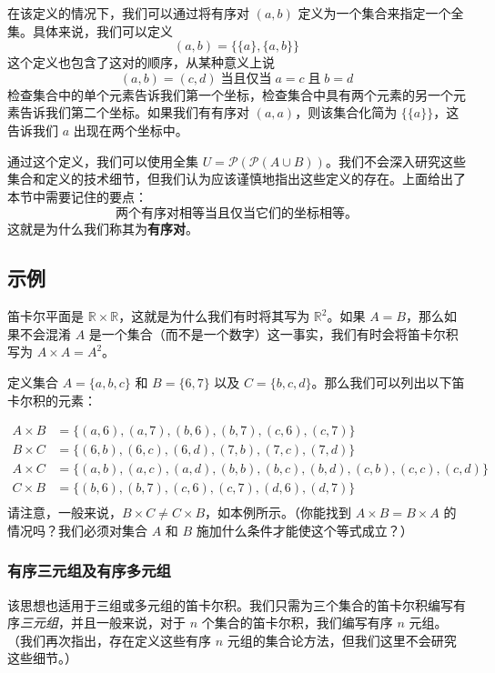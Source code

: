 在该定义的情况下，我们可以通过将有序对 $(a, b)$ 定义为一个集合来指定一个全集。具体来说，我们可以定义
\[(a, b) = \{ \{a\}, \{a, b\} \}\]
这个定义也包含了这对的顺序，从某种意义上说
\[(a, b) = (c, d) \;\text{当且仅当}\; a = c \;\text{且}\; b = d\]
检查集合中的单个元素告诉我们第一个坐标，检查集合中具有两个元素的另一个元素告诉我们第二个坐标。如果我们有有序对 $(a, a)$，则该集合化简为 $\{\{a\}\}$，这告诉我们 $a$ 出现在两个坐标中。

通过这个定义，我们可以使用全集 $U = \mathcal{P}(\mathcal{P}(A \cup B))$。我们不会深入研究这些集合和定义的技术细节，但我们认为应该谨慎地指出这些定义的存在。上面给出了本节中需要记住的要点：
\[\text{两个有序对相等当且仅当它们的坐标相等。}\]
这就是为什么我们称其为\textbf{有序对}。

\subsection{示例}

笛卡尔平面是 $\mathbb{R} \times \mathbb{R}$，这就是为什么我们有时将其写为 $\mathbb{R}^2$。如果 $A = B$，那么如果不会混淆 $A$ 是一个集合（而不是一个数字）这一事实，我们有时会将笛卡尔积写为 $A \times A = A^2$。

\begin{example}
    定义集合 $A = \{a, b, c\}$ 和 $B = \{6, 7\}$ 以及 $C = \{b, c, d\}$。那么我们可以列出以下笛卡尔积的元素：

    \begin{align*}
        A \times B &= \{(a, 6),(a, 7),(b, 6),(b, 7),(c, 6),(c, 7)\} \\
        B \times C &= \{(6, b),(6, c),(6, d),(7, b),(7, c),(7, d)\} \\
        A \times C &= \{(a, b),(a, c),(a, d),(b, b),(b, c),(b, d),(c, b),(c, c),(c, d)\} \\
        C \times B &= \{(b, 6),(b, 7),(c, 6),(c, 7),(d, 6),(d, 7)\}\\
    \end{align*}
    请注意，一般来说，$B \times C \ne C \times B$，如本例所示。（你能找到 $A \times B = B \times A$ 的情况吗？我们必须对集合 $A$ 和 $B$ 施加什么条件才能使这个等式成立？）
\end{example}

\subsubsection*{有序三元组及有序多元组}

该思想也适用于三组或多元组的笛卡尔积。我们只需为三个集合的笛卡尔积编写有序\emph{三元组}，并且一般来说，对于 $n$ 个集合的笛卡尔积，我们编写有序 $n$ 元组。（我们再次指出，存在定义这些有序 $n$ 元组的集合论方法，但我们这里不会研究这些细节。）

